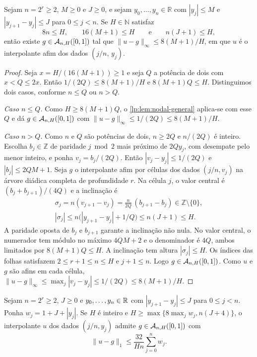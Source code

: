 \documentclass[12pt,a4paper]{article}
\begin{document}
\begin{lema}
\label{lp:lem:nodal-jump}
Sejam $n=2^r\ge2$, $M\ge0$ e $J\ge0$, e sejam $y_0,\dots,y_n\in\mathbb R$ com $|y_j|\le M$ e $|y_{j+1}-y_j|\le J$ para $0\le j<n$. Se $H\in\mathbb N$ satisfaz
\[
 8n\le H,\qquad 16(M+1)\le H\qquad\text{e}\qquad n(J+1)\le H,
\]
então existe $g\in\mathcal A_{n,H}([0,1])$ tal que $\|u-g\|_\infty\le 8(M+1)/H$, em que $u$ é o interpolante afim dos dados $(j/n,\,y_j)$.
\end{lema}

\begin{proof}
Seja $x=H/(16(M+1))\ge1$ e seja $Q$ a potência de dois com $x<Q\le2x$. Então $1/(2Q)\le8(M+1)/H$ e $8(M+1)Q\le H$. Distinguimos dois casos, conforme $n\le Q$ ou $n>Q$.

\emph{Caso $n\le Q$.} Como $H\ge8(M+1)Q$, o \cref{lp:lem:nodal-general} aplica-se com esse $Q$ e dá $g\in\mathcal A_{n,H}([0,1])$ com $\|u-g\|_\infty\le1/(2Q)\le8(M+1)/H$.

\emph{Caso $n>Q$.} Como $n$ e $Q$ são potências de dois, $n\ge2Q$ e $n/(2Q)$ é inteiro. Escolha $b_j\in\mathbb Z$ de paridade $j\bmod2$ mais próximo de $2Qy_j$, com desempate pelo menor inteiro, e ponha $v_j=b_j/(2Q)$. Então $|v_j-y_j|\le1/(2Q)$ e $|b_j|\le2QM+1$. Seja $g$ o interpolante afim por células dos dados $(j/n,v_j)$ na árvore diádica completa de profundidade $r$. Na célula $j$, o valor central é $(b_j+b_{j+1})/(4Q)$ e a inclinação é
\begin{gather*}
 \sigma_j=n(v_{j+1}-v_j)=\frac{n}{2Q}\,(b_{j+1}-b_j)\in\mathbb Z\setminus\{0\},\\
 |\sigma_j|\le n\bigl(|y_{j+1}-y_j|+1/Q\bigr)\le n(J+1)\le H.
\end{gather*}
A paridade oposta de $b_j$ e $b_{j+1}$ garante a inclinação não nula. No valor central, o numerador tem módulo no máximo $4QM+2$ e o denominador é $4Q$, ambos limitados por $8(M+1)Q\le H$. A inclinação tem altura $|\sigma_j|\le H$. Os índices das folhas satisfazem $2\le r+1\le n\le H$ e $j+1\le n$. Logo $g\in\mathcal A_{n,H}([0,1])$. Como $u$ e $g$ são afins em cada célula, $\|u-g\|_\infty\le\max_j|v_j-y_j|\le1/(2Q)\le8(M+1)/H$.
\end{proof}

\begin{lema}
\label{lp:lem:nodal-variable-height}
Sejam $n=2^r\ge2$, $J\ge0$ e $y_0,\ldots,y_n\in\mathbb R$ com $|y_{j+1}-y_j|\le J$ para $0\le j<n$. Ponha $w_j=1+J+|y_j|$. Se $H$ é inteiro e $H\ge\max\{8\max_j w_j,n(J+4)\}$, o interpolante $u$ dos dados $(j/n,y_j)$ admite $g\in\mathcal A_{n,H}([0,1])$ com
\[
 \|u-g\|_1\le\frac{32}{Hn}\sum_{j=0}^n w_j .
\]
\end{lema}
\end{document}
